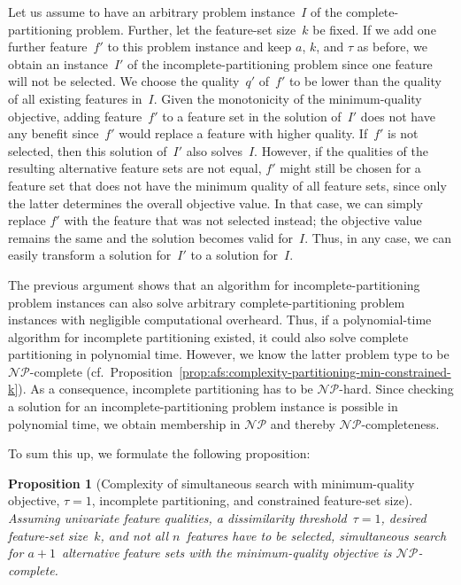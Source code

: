 \documentclass{article}
\newtheorem{proposition}[corollary]{Proposition} %
\theoremstyle{definition}
\begin{document}
Let us assume to have an arbitrary problem instance~$I$ of the complete-partitioning problem.
Further, let the feature-set size~$k$ be fixed.
If we add one further feature~$f'$ to this problem instance and keep $a$, $k$, and $\tau$ as before, we obtain an instance~$I'$ of the incomplete-partitioning problem since one feature will not be selected.
We choose the quality~$q'$ of~$f'$ to be lower than the quality of all existing features in~$I$.
Given the monotonicity of the minimum-quality objective, adding feature~$f'$ to a feature set in the solution of~$I'$ does not have any benefit since~$f'$ would replace a feature with higher quality.
If~$f'$ is not selected, then this solution of~$I'$ also solves~$I$.
However, if the qualities of the resulting alternative feature sets are not equal, $f'$ might still be chosen for a feature set that does not have the minimum quality of all feature sets, since only the latter determines the overall objective value.
In that case, we can simply replace $f'$ with the feature that was not selected instead; the objective value remains the same and the solution becomes valid for~$I$.
Thus, in any case, we can easily transform a solution for~$I'$ to a solution for~$I$.

The previous argument shows that an algorithm for incomplete-partitioning problem instances can also solve arbitrary complete-partitioning problem instances with negligible computational overheard.
Thus, if a polynomial-time algorithm for incomplete partitioning existed, it could also solve complete partitioning in polynomial time.
However, we know the latter problem type to be $\mathcal{NP}$-complete (cf.~Proposition~\ref{prop:afs:complexity-partitioning-min-constrained-k}).
As a consequence, incomplete partitioning has to be $\mathcal{NP}$-hard.
Since checking a solution for an incomplete-partitioning problem instance is possible in polynomial time, we obtain membership in $\mathcal{NP}$ and thereby $\mathcal{NP}$-completeness.

To sum this up, we formulate the following proposition:
%
\begin{proposition}[Complexity of simultaneous search with minimum-quality objective, $\tau=1$, incomplete partitioning, and constrained feature-set size]
	Assuming univariate feature qualities, a dissimilarity threshold~$\tau = 1$, desired feature-set size~$k$, and \emph{not} all $n$~features have to be selected, simultaneous search for $a + 1$~alternative feature sets with the minimum-quality objective is $\mathcal{NP}$-complete.
	\label{prop:afs:complexity-incomplete-partitioning-min-constrained-k}
\end{proposition}
\end{document}
